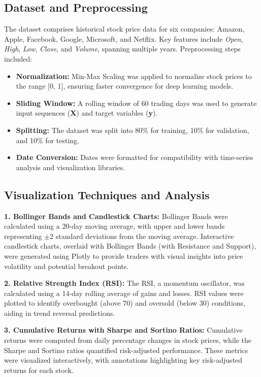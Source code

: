 \documentclass[conference]{IEEEtran}
\begin{document}
\subsection{Dataset and Preprocessing}
The dataset comprises historical stock price data for six companies: Amazon, Apple, Facebook, Google, Microsoft, and Netflix. Key features include \textit{Open}, \textit{High}, \textit{Low}, \textit{Close}, and \textit{Volume}, spanning multiple years. Preprocessing steps included:
\begin{itemize}
    \item \textbf{Normalization:} Min-Max Scaling was applied to normalize stock prices to the range [0, 1], ensuring faster convergence for deep learning models.
    \item \textbf{Sliding Window:} A rolling window of 60 trading days was used to generate input sequences (\textbf{X}) and target variables (\textbf{y}).
    \item \textbf{Splitting:} The dataset was split into 80\% for training, 10\% for validation, and 10\% for testing.
    \item \textbf{Date Conversion:} Dates were formatted for compatibility with time-series analysis and visualization libraries.
\end{itemize}

\subsection{Visualization Techniques and Analysis}
\textbf{1. Bollinger Bands and Candlestick Charts:} 
Bollinger Bands were calculated using a 20-day moving average, with upper and lower bands representing $\pm 2$ standard deviations from the moving average. Interactive candlestick charts, overlaid with Bollinger Bands (with Resistance and Support), were generated using Plotly to provide traders with visual insights into price volatility and potential breakout points.

\textbf{2. Relative Strength Index (RSI):}
The RSI, a momentum oscillator, was calculated using a 14-day rolling average of gains and losses. RSI values were plotted to identify overbought (above 70) and oversold (below 30) conditions, aiding in trend reversal predictions.

\textbf{3. Cumulative Returns with Sharpe and Sortino Ratios:}
Cumulative returns were computed from daily percentage changes in stock prices, while the Sharpe and Sortino ratios quantified risk-adjusted performance. These metrics were visualized interactively, with annotations highlighting key risk-adjusted returns for each stock.
\end{document}
